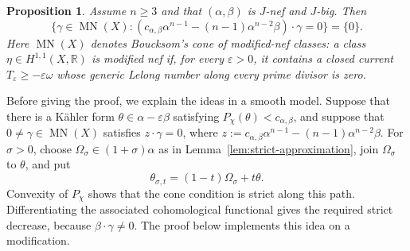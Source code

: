 \documentclass[reqno]{amsart}
\newcommand{\R}{\mathbb{R}}
\newcommand{\MN}{\operatorname{MN}}
\newcommand{\cab}{c_{\alpha,\beta}}
\theoremstyle{plain}
\newtheorem{proposition}[thm]{Proposition}
\theoremstyle{remark}
\begin{document}
\begin{proposition}
\label{prop:radical-obstruction}
Assume $n\geq3$ and that $(\alpha,\beta)$ is $J$-nef and
$J$-big. Then
\[
\{\gamma\in \MN(X):(\cab\alpha^{n-1}-(n-1)\alpha^{n-2}\beta)\cdot \gamma=0\}=\{0\}.
\]
Here $\MN(X)$ denotes Boucksom's cone of modified-nef classes: a class
$\eta\in H^{1,1}(X,\R)$ is modified nef if, for every $\varepsilon>0$,
it contains a closed current $T_\varepsilon\geq-\varepsilon\omega$ whose
generic Lelong number along every prime divisor is zero.
\end{proposition}
Before giving the proof, we explain the ideas in a smooth model.
Suppose that there is a K\"ahler form
$\theta\in\alpha-\varepsilon\beta$ satisfying
$P_\chi(\theta)<\cab$, and suppose that $0\ne\gamma\in\MN(X)$
satisfies $z\cdot\gamma=0$, where
$z:=\cab\alpha^{n-1}-(n-1)\alpha^{n-2}\beta$. For $\sigma>0$,
choose $\Omega_\sigma\in(1+\sigma)\alpha$ as in
Lemma~\ref{lem:strict-approximation}, join $\Omega_\sigma$ to $\theta$,
and put
\[
 \theta_{\sigma,t}=(1-t)\Omega_\sigma+t\theta.
\]
Convexity of $P_\chi$ shows that the cone condition is strict along
this path. Differentiating the associated cohomological functional
gives the required strict decrease, because
$\beta\cdot\gamma\ne0$. The proof below implements this idea on a
modification.
\end{document}
